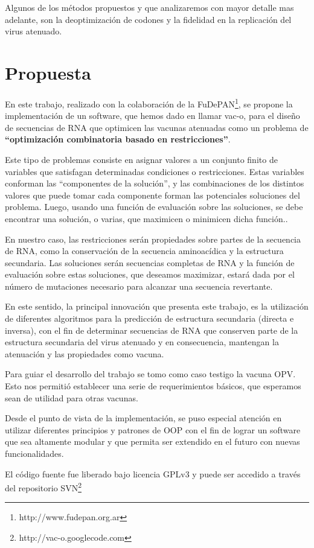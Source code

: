 Algunos de los m\'etodos propuestos y que analizaremos con mayor detalle mas
adelante, son la deoptimizaci\'on  de codones\cite{Coleman08} y la fidelidad en
la replicaci\'on del virus atenuado\cite{Vignuzzi08}.

\section{Propuesta}
\label{propuesta}
En este trabajo, realizado con la colaboraci\'on de la
\ac{FuDePAN}\footnote{http://www.fudepan.org.ar}, se propone la
implementaci\'on de un software, que hemos dado en llamar \ac{vac-o}, para el
dise\~no de secuencias de \ac{RNA} que optimicen las vacunas atenuadas como un
problema de \textbf{``optimizaci\'on combinatoria basado en restricciones''}. 

Este tipo de problemas consiste en asignar valores a un conjunto finito de
variables que satisfagan determinadas condiciones o restricciones. Estas
variables conforman las ``componentes de la soluci\'on'', y las combinaciones de
los distintos valores que puede tomar cada componente forman las potenciales
soluciones del problema. Luego, usando una funci\'on de evaluaci\'on sobre las
soluciones, se debe encontrar una soluci\'on, o varias, que maximicen o
minimicen dicha funci\'on.\cite{Hoos04}.

En nuestro caso, las restricciones ser\'an propiedades sobre partes de la
secuencia de \ac{RNA}, como la conservaci\'on de la secuencia aminoac\'idica y
la estructura secundaria. Las soluciones ser\'an secuencias completas de
\ac{RNA} y la funci\'on de evaluaci\'on sobre estas soluciones, que deseamos
maximizar, estar\'a dada por el n\'umero de mutaciones necesario para alcanzar
una secuencia revertante.

En este sentido, la principal innovaci\'on que presenta este trabajo, es la
utilizaci\'on de diferentes algoritmos para la predicci\'on de estructura
secundaria (directa e inversa), con el fin de determinar secuencias de
\ac{RNA} que conserven parte de la estructura secundaria del virus atenuado y
en consecuencia, mantengan la atenuaci\'on y las propiedades como vacuna.

Para guiar el desarrollo del trabajo se tomo como caso testigo la vacuna
\ac{OPV}. Esto nos permiti\'o establecer una serie de requerimientos b\'asicos,
que esperamos sean de utilidad para otras vacunas.

Desde el punto de vista de la implementaci\'on, se puso especial atenci\'on en
utilizar diferentes principios y patrones de \ac{OOP} con
el fin de lograr un software que sea altamente modular y que permita ser
extendido en el futuro con nuevas funcionalidades.

El c\'odigo fuente fue liberado bajo licencia \ac{GPLv3} y puede ser accedido a
trav\'es del repositorio \ac{SVN}\footnote{http://vac-o.googlecode.com}